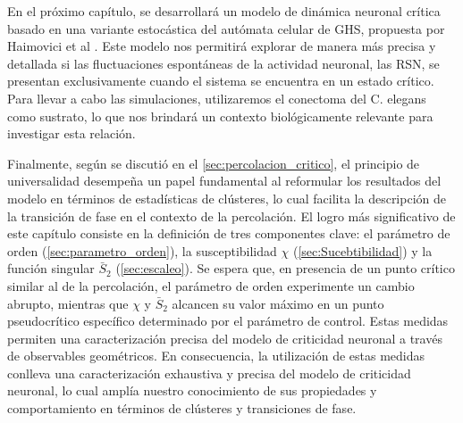 En el próximo capítulo, se desarrollará un modelo de dinámica neuronal crítica basado en una variante estocástica del autómata celular de GHS, propuesta por Haimovici et al \cite{haimovici_brain_2013}. Este modelo nos permitirá explorar de manera más precisa y detallada si las fluctuaciones espontáneas de la actividad neuronal, las RSN, se presentan exclusivamente cuando el sistema se encuentra en un estado crítico. Para llevar a cabo las simulaciones, utilizaremos el conectoma del C. elegans como sustrato, lo que nos brindará un contexto biológicamente relevante para investigar esta relación.




Finalmente, según se discutió en el \cref{sec:percolacion_critico}, el principio de universalidad desempeña un papel fundamental al reformular los resultados del modelo en términos de estadísticas de clústeres, lo cual facilita la descripción de la transición de fase en el contexto de la percolación.  El logro más significativo de este capítulo consiste en la definición de tres componentes clave: el parámetro de orden (\cref{sec:parametro_orden}), la susceptibilidad  $\chi$ (\cref{sec:Sucebtibilidad}) y la función singular $\bar{S}_2$  (\cref{sec:escaleo}). Se espera que, en presencia de un punto crítico similar al de la percolación, el parámetro de orden experimente un cambio abrupto, mientras que $\chi$ y $\bar{S}_2$  alcancen su valor máximo en un punto pseudocrítico específico determinado por el parámetro de control. Estas medidas permiten una caracterización precisa del modelo de criticidad neuronal a través de observables geométricos. En consecuencia, la utilización de estas medidas conlleva una caracterización exhaustiva y precisa del modelo de criticidad neuronal, lo cual amplía nuestro conocimiento de sus propiedades y comportamiento en términos de clústeres y transiciones de fase. 



 





